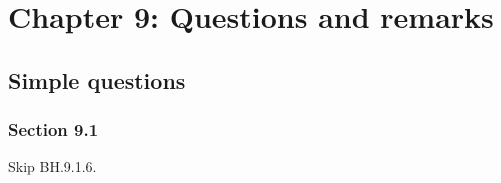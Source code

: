 



\chapter{Chapter 9: Questions and remarks}

\section{Simple questions}


\subsection*{Section 9.1}

\begin{remark}
Skip BH.9.1.6.
\end{remark}

